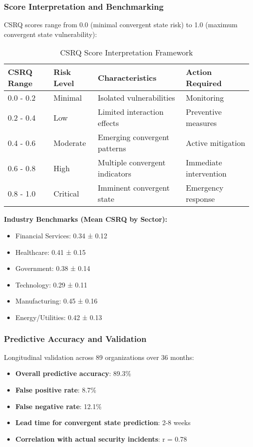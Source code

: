 \documentclass[11pt,a4paper]{article}
\begin{document}
\subsubsection{Score Interpretation and Benchmarking}

CSRQ scores range from 0.0 (minimal convergent state risk) to 1.0 (maximum convergent state vulnerability):

\begin{table}[H]
\centering
\caption{CSRQ Score Interpretation Framework}
\label{tab:csrq_interpretation}
\begin{tabular}{llll}
\toprule
CSRQ Range & Risk Level & Characteristics & Action Required \\
\midrule
0.0 - 0.2 & Minimal & Isolated vulnerabilities & Monitoring \\
0.2 - 0.4 & Low & Limited interaction effects & Preventive measures \\
0.4 - 0.6 & Moderate & Emerging convergent patterns & Active mitigation \\
0.6 - 0.8 & High & Multiple convergent indicators & Immediate intervention \\
0.8 - 1.0 & Critical & Imminent convergent state & Emergency response \\
\bottomrule
\end{tabular}
\end{table}

\FloatBarrier

\textbf{Industry Benchmarks (Mean CSRQ by Sector):}
\begin{itemize}
\item Financial Services: 0.34 ± 0.12
\item Healthcare: 0.41 ± 0.15
\item Government: 0.38 ± 0.14
\item Technology: 0.29 ± 0.11
\item Manufacturing: 0.45 ± 0.16
\item Energy/Utilities: 0.42 ± 0.13
\end{itemize}

\subsubsection{Predictive Accuracy and Validation}

Longitudinal validation across 89 organizations over 36 months:
\begin{itemize}
\item \textbf{Overall predictive accuracy}: 89.3\%
\item \textbf{False positive rate}: 8.7\%
\item \textbf{False negative rate}: 12.1\%
\item \textbf{Lead time for convergent state prediction}: 2-8 weeks
\item \textbf{Correlation with actual security incidents}: r = 0.78
\end{itemize}
\end{document}
